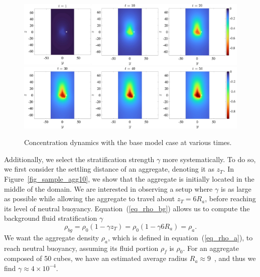 \begin{figure}[ht]
	\begin{center}
		\includegraphics[scale=0.65]{./figures/fig_NC50_snaps_pt1.pdf}
		\includegraphics[scale=0.65]{./figures/fig_NC50_snaps_pt2.pdf}
	\caption{Concentration dynamics with the base model case at various times.}
	\label{fig_NC50_snaps_all}
\end{center}
\end{figure}
\par
Additionally, we select the stratification strength $\gamma$ more systematically. 
To do so, we first consider the settling distance of an aggregate, denoting it as $z_T$. In Figure~\ref{fig_sample_agg10}, we show that the aggregate is initially located in the middle of the domain. We are interested in observing a setup where $\gamma$ is as large as possible while allowing the aggregate to travel about $z_T = 6R_a$, before
reaching its level of neutral buoyancy.
Equation~(\ref{eq_rho_bg}) allows us to compute the background fluid stratification $\gamma$
\begin{equation}
	\rho_{bg} = \rho_0 (1-\gamma z_T) =	\rho_0 (1 - \gamma 6R_a ) = \rho_a.
	\label{eq_compute_G}
\end{equation}
We want the aggregate density $\rho_a$, which is defined in equation~(\ref{eq_rho_a}), to reach neutral buoyancy, assuming its fluid portion $\rho_f$ is $\rho_0$.
For an aggregate composed of 50 cubes, we have an estimated average radius $R_a \approx 9$~\cite{yoo_hydrodynamic_2020}, and thus we find $\gamma \approx 4 \times 10^{-4}$.  
